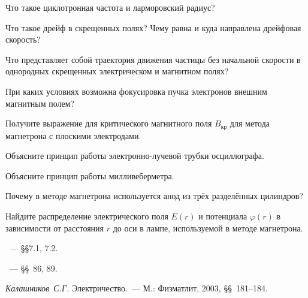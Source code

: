 \begin{lab:questions}
\item Что такое циклотронная частота и ларморовский радиус?
\item Что такое дрейф в скрещенных полях? Чему равна и куда направлена дрейфовая скорость?
\item Что представляет собой траектория движения частицы без начальной скорости 
в однородных скрещенных электрическом и магнитном полях?
\item При каких условиях возможна фокусировка пучка электронов внешним 
магнитным полем?
\item Получите выражение для критического магнитного поля $B_{кр}$ для метода магнетрона
с плоскими электродами.
\item Объясните принцип работы электронно-лучевой трубки осциллографа.
\item Объясните принцип работы милливеберметра.
\item Почему в методе магнетрона используется анод из трёх разделённых цилиндров?
\item Найдите распределение электрического поля $E(r)$ и потенциала $\varphi(r)$ 
в зависимости от расстояния $r$ до оси в лампе, используемой в методе магнетрона.
\end{lab:questions}

\begin{lab:literature}
    \item \Kirichenko~--- \S\S7.1, 7.2.
    \item \SivuhinIII~--- \S\S~86, 89.
\item \emph{Калашников~С.Г.} Электричество.~--- М.: Физматлит, 2003,
\S\S~181--184.
\end{lab:literature}


